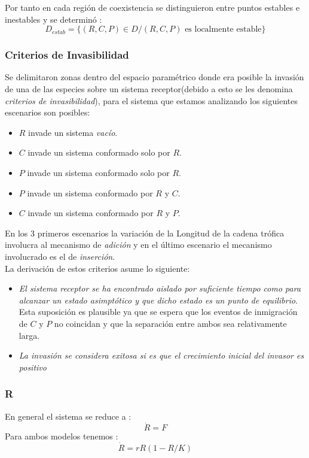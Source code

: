 Por tanto en cada regi\'on de coexistencia se distinguieron entre puntos estables e inestables  y se determin\'o :
\begin{equation}\label{eq:estabreg}
D_{estab} = \{ (R,C,P) \in D / (R,C,P) \mbox{ es localmente estable} \}
\end{equation}

\subsubsection{Criterios de Invasibilidad}
Se delimitaron zonas dentro del espacio param\'etrico donde era posible la invasi\'on de una de las especies sobre un sistema receptor(debido a esto se les denomina \emph{criterios de invasibilidad}), para el sistema que estamos analizando los siguientes escenarios son posibles: 
\begin{itemize}
\item $R$ invade un sistema \emph{vac\'io}.
\item $C$ invade un sistema conformado solo por $R$.
\item $P$ invade un sistema conformado solo por $R$.
\item $P$ invade un sistema conformado por $R$ y $C$.
\item $C$ invade un sistema conformado por $R$ y $P$.
\end{itemize}
En los 3 primeros escenarios la variaci\'on de la Longitud de la cadena tr\'ofica involucra al mecanismo de \textit{adici\'on} y en el \'ultimo escenario el mecanismo involucrado es el de \textit{inserci\'on}.\\

La derivaci\'on de estos criterios asume lo siguiente:
\begin{itemize}
\item \emph{El sistema receptor se ha encontrado aislado por suficiente tiempo como para alcanzar un estado asimpt\'otico y que dicho estado es un punto de equilibrio}.\\Esta suposici\'on es plausible ya que se espera que los eventos de inmigraci\'on de $C$ y $P$ no coincidan y que la separaci\'on entre ambos sea relativamente larga.
\item \emph{La invasi\'on se considera exitosa si es que el crecimiento inicial del invasor es positivo}
\end{itemize}

\subsubsection{R}
En general el sistema se reduce a :
\begin{equation}
\dot{R}= F 
\end{equation}
Para ambos modelos tenemos :
\begin{equation}
\dot{R}= rR(1-R/K)
\end{equation}


